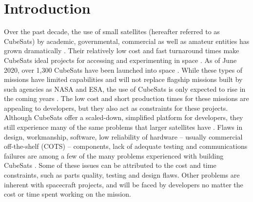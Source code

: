 \documentclass[conf]{new-aiaa}
\begin{document}
\begin{abstract}
\end{abstract}


\section{Introduction}

Over the past decade, the use of small satellites (hereafter referred to as CubeSats) by academic, governmental, commercial as well as amateur entities has grown dramatically \cite{cubesat101,Poghosyan2016,Villela2019}. Their relatively low cost and fast turnaround times make CubeSats ideal projects for accessing and experimenting in space \cite{cubesat101}. As of June 2020, over 1,300 CubeSats have been launched into space \cite{Kulu2020}. While these types of missions have limited capabilities and will not replace flagship missions built by such agencies as NASA and ESA, the use of CubeSats is only expected to rise in the coming years \cite{Improving2017,cubesat101}. The low cost and short production times for these missions are appealing to developers, but they also act as constraints for these projects. Although CubeSats offer a scaled-down, simplified platform for developers, they still experience many of the same problems that larger satellites have \cite{Improving2017}. Flaws in design, workmanship, software, low reliability of hardware -- usually commercial off-the-shelf (COTS) -- components, lack of adequate testing and communications failures are among a few of the many problems experienced with building CubeSats \cite{Improving2017}. Some of these issues can be attributed to the cost and time constraints, such as parts quality, testing and design flaws. Other problems are inherent with spacecraft projects, and will be faced by developers no matter the cost or time spent working on the mission.
\end{document}
